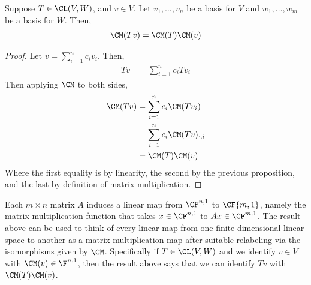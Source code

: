 \documentclass{article}
\begin{document}
  \begin{prop}
    Suppose $T \in \CL(V, W)$, and $v \in V$. Let $v_1, \dots, v_n$ be a basis for $V$ and $w_1, \dots, w_m$ be a basis for $W$. Then,
    \begin{align*}
      \CM(Tv) = \CM(T)\CM(v)
    \end{align*}
  \end{prop}
  \begin{proof}
    Let $v = \sum_{i = 1}^{n}c_iv_i$. Then,
    \begin{align*}
      Tv & = \sum_{i = 1}^{n}c_iTv_i
    \end{align*}
    Then applying $\CM$ to both sides,
    \begin{align*}
      \CM(Tv) & = \sum_{i = 1}^{n}c_i\CM(Tv_i) \\
      & = \sum_{i = 1}^{n}c_i\CM(Tv)_{\cdot, i} \\
      & = \CM(T)\CM(v)
    \end{align*}
    Where the first equality is by linearity, the second by the previous proposition, and the last by definition of matrix multiplication.
  \end{proof}
  Each $m\times n$ matrix $A$ induces a linear map from $\CF^{n, 1}$ to $\CF{m, 1}$, namely the matrix multiplication function that takes $x \in \CF^{n, 1}$ to $Ax \in \CF^{m , 1}$. The
  result above can be used to think of every linear map from one finite dimensional linear space to another as a matrix multiplication map after suitable relabeling via the isomorphisms
  given by $\CM$. Specifically if $T \in \CL(V, W)$ and we identify $v \in V$ with $\CM(v) \in \F^{n, 1}$, then the result above says that we can identify $Tv$ with $\CM(T)\CM(v)$.
\end{document}
